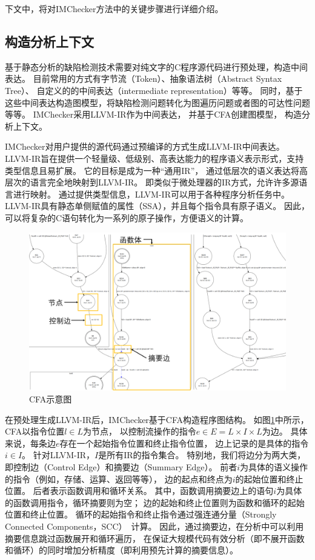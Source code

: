 下文中，将对IMChecker方法中的关键步骤进行详细介绍。

\subsection{构造分析上下文}
基于静态分析的缺陷检测技术需要对纯文字的C程序源代码进行预处理，构造中间表达。
目前常用的方式有字节流（Token）、抽象语法树（Abstract Syntax Tree）、
自定义的的中间表达（intermediate representation）等等。
同时，基于这些中间表达构造图模型，将缺陷检测问题转化为图遍历问题或者图的可达性问题等等。
IMChecker采用LLVM-IR作为中间表达，
并基于CFA创建图模型，
构造分析上下文。

IMChecker对用户提供的源代码通过预编译的方式生成LLVM-IR中间表达。
LLVM-IR旨在提供一个轻量级、低级别、高表达能力的程序语义表示形式，支持类型信息且易扩展。
它的目标是成为一种“通用IR”，
通过低层次的语义表达将高层次的语言完全地映射到LLVM-IR。
即类似于微处理器的IR方式，允许许多源语言进行映射。
通过提供类型信息，LLVM-IR可以用于各种程序分析任务中。
LLVM-IR具有静态单侧赋值的属性（SSA），并且每个指令具有原子语义。
因此，可以将复杂的C语句转化为一系列的原子操作，方便语义的计算。

\begin{figure}[t]
	\centering
	\includegraphics[width=0.7\linewidth]{figures/cp3-3-cfa.png}
	\caption{
		CFA示意图
	}
	\label{fig:3-3-cfa}
\end{figure}

在预处理生成LLVM-IR后，IMChecker基于CFA构造程序图结构。
如图\ref{fig:3-3-cfa}中所示，CFA以指令位置$l \in L$为节点，
以控制流操作的指令$e \in E = L \times I \times L$为边。
具体来说，每条边$e$存在一个起始指令位置和终止指令位置，
边上记录的是具体的指令$i \in I$。
针对LLVM-IR，$I$是所有IR的指令集合。
特别地，我们将边分为两大类，即控制边（Control Edge）和摘要边（Summary Edge）。
前者$i$为具体的语义操作的指令（例如，存储、运算、返回等等），
边的起点和终点为$i$的起始位置和终止位置。
后者表示函数调用和循环关系。
其中，函数调用摘要边上的语句$i$为具体的函数调用指令，循环摘要则为空；
边的起始和终止位置则为函数和循环的起始位置和终止位置。
循环的起始指令和终止指令通过强连通分量（Strongly Connected Components，SCC）~\cite{12-ele-scc}计算。
因此，通过摘要边，在分析中可以利用摘要信息跳过函数展开和循环遍历，
在保证大规模代码有效分析（即不展开函数和循环）的同时增加分析精度（即利用预先计算的摘要信息）。


